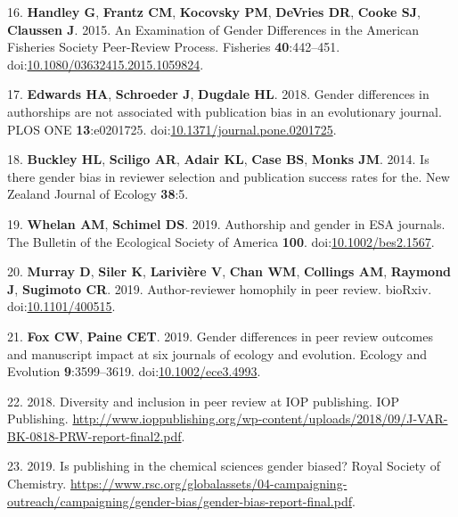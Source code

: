\documentclass[11pt,]{article}
\begin{document}
\leavevmode\hypertarget{ref-handley_examination_2015}{}%
16. \textbf{Handley G}, \textbf{Frantz CM}, \textbf{Kocovsky PM},
\textbf{DeVries DR}, \textbf{Cooke SJ}, \textbf{Claussen J}. 2015. An
Examination of Gender Differences in the American Fisheries Society
Peer-Review Process. Fisheries \textbf{40}:442--451.
doi:\href{https://doi.org/10.1080/03632415.2015.1059824}{10.1080/03632415.2015.1059824}.

\leavevmode\hypertarget{ref-edwards_gender_2018}{}%
17. \textbf{Edwards HA}, \textbf{Schroeder J}, \textbf{Dugdale HL}.
2018. Gender differences in authorships are not associated with
publication bias in an evolutionary journal. PLOS ONE
\textbf{13}:e0201725.
doi:\href{https://doi.org/10.1371/journal.pone.0201725}{10.1371/journal.pone.0201725}.

\leavevmode\hypertarget{ref-buckley_is_2014}{}%
18. \textbf{Buckley HL}, \textbf{Sciligo AR}, \textbf{Adair KL},
\textbf{Case BS}, \textbf{Monks JM}. 2014. Is there gender bias in
reviewer selection and publication success rates for the. New Zealand
Journal of Ecology \textbf{38}:5.

\leavevmode\hypertarget{ref-Whelan2019}{}%
19. \textbf{Whelan AM}, \textbf{Schimel DS}. 2019. Authorship and gender
in ESA journals. The Bulletin of the Ecological Society of America
\textbf{100}.
doi:\href{https://doi.org/10.1002/bes2.1567}{10.1002/bes2.1567}.

\leavevmode\hypertarget{ref-Murray400515}{}%
20. \textbf{Murray D}, \textbf{Siler K}, \textbf{Larivière V},
\textbf{Chan WM}, \textbf{Collings AM}, \textbf{Raymond J},
\textbf{Sugimoto CR}. 2019. Author-reviewer homophily in peer review.
bioRxiv. doi:\href{https://doi.org/10.1101/400515}{10.1101/400515}.

\leavevmode\hypertarget{ref-fox_gender_2019}{}%
21. \textbf{Fox CW}, \textbf{Paine CET}. 2019. Gender differences in
peer review outcomes and manuscript impact at six journals of ecology
and evolution. Ecology and Evolution \textbf{9}:3599--3619.
doi:\href{https://doi.org/10.1002/ece3.4993}{10.1002/ece3.4993}.

\leavevmode\hypertarget{ref-Physics_2018}{}%
22. 2018. Diversity and inclusion in peer review at IOP publishing. IOP
Publishing.
\url{http://www.ioppublishing.org/wp-content/uploads/2018/09/J-VAR-BK-0818-PRW-report-final2.pdf}.

\leavevmode\hypertarget{ref-RoyalChem_2019}{}%
23. 2019. Is publishing in the chemical sciences gender biased? Royal
Society of Chemistry.
\url{https://www.rsc.org/globalassets/04-campaigning-outreach/campaigning/gender-bias/gender-bias-report-final.pdf}.
\end{document}
